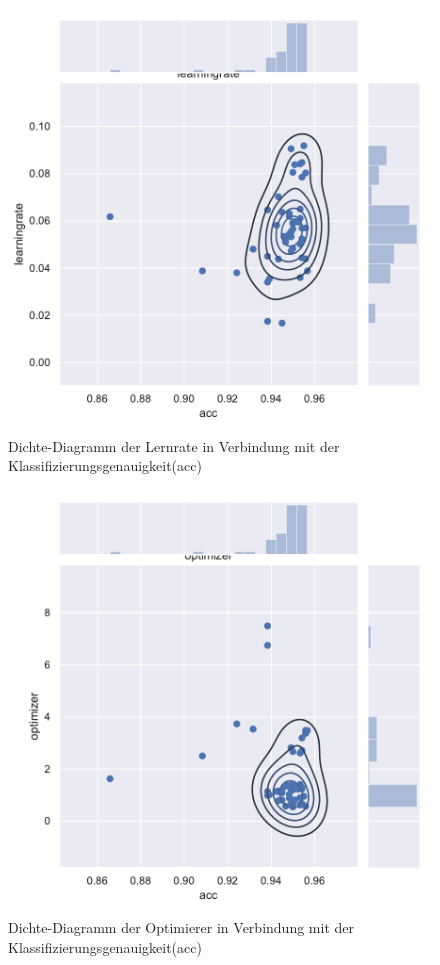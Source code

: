 \begin{figure}[H]
  \centering  
  \includegraphics[scale=0.5]{anhang/GA_250_mnist_digits_True_small_jointplot_learningrate.pdf}
  \caption{Dichte-Diagramm der Lernrate in Verbindung mit der Klassifizierungsgenauigkeit(acc)}
  
\end{figure}

\begin{figure}[H]
  \centering  
  \includegraphics[scale=0.5]{anhang/GA_250_mnist_digits_True_small_jointplot_optimizer.pdf}
  \caption{Dichte-Diagramm der Optimierer in Verbindung mit der Klassifizierungsgenauigkeit(acc)}
  
\end{figure}


